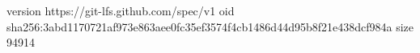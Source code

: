 version https://git-lfs.github.com/spec/v1
oid sha256:3abd1170721af973e863aee0fc35ef3574f4cb1486d44d95b8f21e438dcf984a
size 94914
